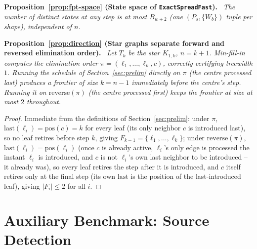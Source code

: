 \documentclass[ASNA,number]{USG}
\newenvironment{repeatproposition}[1][]{\par\medskip\noindent\textbf{#1.}\ \itshape}{\par\medskip}
\begin{document}
\begin{repeatproposition}[Proposition~\ref{prop:fpt-space} (State space of \texttt{ExactSpreadFast})]
The number of distinct states at any step is at most $B_{w+2}$ (one
$(P_s,\{W_b\})$ tuple per shape), independent of $n$.
\end{repeatproposition}

\begin{repeatproposition}[Proposition~\ref{prop:direction} (Star graphs separate forward and reversed elimination order)]
Let $T_k$ be the star $K_{1,k}$, $n=k+1$. Min-fill-in computes the
elimination order $\pi=(\ell_1,\dots,\ell_k,c)$, correctly certifying
treewidth $1$. Running the schedule of Section~\ref{sec:prelim} directly on
$\pi$ (the centre processed last) produces a frontier of size $k=n-1$
immediately before the centre's step. Running it on $\mathrm{reverse}(\pi)$
(the centre processed first) keeps the frontier at size at most $2$
throughout.
\end{repeatproposition}
\begin{proof}
Immediate from the definitions of Section~\ref{sec:prelim}: under $\pi$,
$\mathrm{last}(\ell_i)=\mathrm{pos}(c)=k$ for every leaf (its only neighbor
$c$ is introduced last), so no leaf retires before step $k$, giving
$F_{k-1}=\{\ell_1,\dots,\ell_k\}$; under $\mathrm{reverse}(\pi)$,
$\mathrm{last}(\ell_i)=\mathrm{pos}(\ell_i)$ (once $c$ is already active,
$\ell_i$'s only edge is processed the instant $\ell_i$ is introduced, and
$c$ is not $\ell_i$'s own last neighbor to be introduced -- it already was),
so every leaf retires the step after it is introduced, and $c$ itself
retires only at the final step (its own $\mathrm{last}$ is the position of
the last-introduced leaf), giving $|F_i|\le 2$ for all $i$.
\end{proof}

\section{Auxiliary Benchmark: Source Detection}\label{ec:source-experiments}
\end{document}
